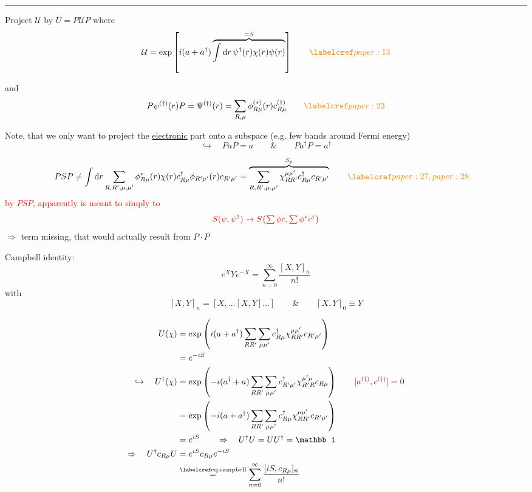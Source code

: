\hrule


 Project \(\mathcal U\) by \(U=P\mathcal U P\) where
\[
\mathcal U=\exp\left[i(a+a^\dagger)
 \overbrace{\int \dint r\,\psi^\dagger(r)\chi(r)\psi(r)}^{\annotation{=S}}\right]
 \qquad \paperref{paper:13}
\]

and
\[
P\psi^{(\dagger)}(r)P
  =\Psi^{(\dagger)}(r)=\sum_{R,\mu}\phi^{(*)}_{R\mu}(r)c^{(\dagger)}_{R\mu}
  \qquad \paperref{paper:23}
\]

 Note, that we only want to project the \underline{electronic} part
onto a subspace (e.g. few bands around Fermi energy)
\[
\hookrightarrow\quad PaP=a\qquad\&\qquad Pa^\dagger P=a^\dagger
\]


\begin{align*}
PSP\mathrel{\textcolor{red}{\ne}}
  \int \dint r\sum_{R,R',\mu,\mu'}
    \phi^*_{R\mu}(r)\chi(r)c^\dagger_{R\mu}
    \phi_{R'\mu'}(r)c_{R'\mu'}
   &=\overbrace{\sum_{R,R',\mu,\mu'}
       \chi_{RR'}^{\mu\mu'}c^\dagger_{R\mu}c_{R'\mu'}}
       ^{\annotation{S_p}}
     \qquad \paperref{paper:27,paper:28}
\end{align*}
\textcolor{red}{by \(PSP\), apparently is meant to simply to}
\[
\textcolor{red}{
S(\psi,\psi^\dagger)\to S\bigl(\textstyle\sum\phi c,
                              \textstyle\sum\phi^*c^\dagger\bigr)}
\]
\(\Rightarrow\) term missing, that would actually result from \(P\cdot P\)

 Campbell identity:
\begin{equation}
e^X Y e^{-X}=\sum_{n=0}^\infty\frac{[X,Y]_n}{n!}
\label{eq:campbell}
\end{equation}
with
\[
[X,Y]_n=[X,\ldots[X,Y]\ldots]
\qquad\&\qquad [X,Y]_0\equiv Y
\]


\begin{align*}
U(\chi)
 &=\exp\left(i(a+a^\dagger)\sum_{RR'}\sum_{\mu\mu'}
         c^\dagger_{R\mu}\chi_{RR'}^{\mu\mu'}c_{R'\mu'}\right)\\
 &=e^{-iS}\\
\hookrightarrow\quad U^\dagger(\chi)
 &=\exp\left(-i(a^\dagger+a)\sum_{RR'}\sum_{\mu\mu'}
       c^\dagger_{R'\mu'}\chi_{R'R}^{\mu'\mu}c_{R\mu}\right)
       \qquad \annotation{[a^{(\dagger)},c^{(\dagger)}]=0}\\
 &=\exp\left(-i(a+a^\dagger)\sum_{RR'}\sum_{\mu\mu'}
       c^\dagger_{R\mu}\chi_{RR'}^{\mu\mu'}c_{R'\mu'}\right)\\
 &=e^{iS}\qquad\Rightarrow\quad U^\dagger U=UU^\dagger=\mathbb 1\\
\Rightarrow\quad U^\dagger c_{R\mu}U
 &=e^{iS}c_{R\mu}e^{-iS}\\
 &\stepref{eq:campbell}\sum_{n=0}^\infty\frac{[iS,c_{R\mu}]_n}{n!}
\end{align*}

